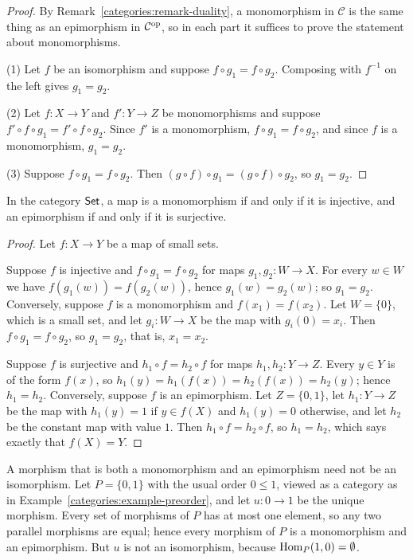 \begin{proof}
By Remark~\ref{categories:remark-duality}, a monomorphism in $\mathcal{C}$ is
the same thing as an epimorphism in $\mathcal{C}^{\mathrm{op}}$, so in each part it
suffices to prove the statement about monomorphisms.

(1) Let $f$ be an isomorphism and suppose $f \circ g_1 = f \circ g_2$.
Composing with $f^{-1}$ on the left gives $g_1 = g_2$.

(2) Let $f \colon X \to Y$ and $f' \colon Y \to Z$ be monomorphisms and suppose
$f' \circ f \circ g_1 = f' \circ f \circ g_2$. Since $f'$ is a monomorphism,
$f \circ g_1 = f \circ g_2$, and since $f$ is a monomorphism, $g_1 = g_2$.

(3) Suppose $f \circ g_1 = f \circ g_2$. Then
$(g \circ f) \circ g_1 = (g \circ f) \circ g_2$, so $g_1 = g_2$.
\end{proof}

\begin{lemma}\label{categories:lemma-mono-epi-sets}
In the category $\mathsf{Set}$, a map is a monomorphism if and only if it is
injective, and an epimorphism if and only if it is surjective.
\end{lemma}

\begin{proof}
Let $f \colon X \to Y$ be a map of small sets.

Suppose $f$ is injective and $f \circ g_1 = f \circ g_2$ for maps
$g_1, g_2 \colon W \to X$. For every $w \in W$ we have
$f(g_1(w)) = f(g_2(w))$, hence $g_1(w) = g_2(w)$; so $g_1 = g_2$. Conversely,
suppose $f$ is a monomorphism and $f(x_1) = f(x_2)$. Let $W = \{0\}$, which is
a small set, and let $g_i \colon W \to X$ be the map with $g_i(0) = x_i$. Then
$f \circ g_1 = f \circ g_2$, so $g_1 = g_2$, that is, $x_1 = x_2$.

Suppose $f$ is surjective and $h_1 \circ f = h_2 \circ f$ for maps
$h_1, h_2 \colon Y \to Z$. Every $y \in Y$ is of the form $f(x)$, so
$h_1(y) = h_1(f(x)) = h_2(f(x)) = h_2(y)$; hence $h_1 = h_2$. Conversely,
suppose $f$ is an epimorphism. Let $Z = \{0, 1\}$, let $h_1 \colon Y \to Z$ be
the map with $h_1(y) = 1$ if $y \in f(X)$ and $h_1(y) = 0$ otherwise, and let
$h_2$ be the constant map with value $1$. Then $h_1 \circ f = h_2 \circ f$,
so $h_1 = h_2$, which says exactly that $f(X) = Y$.
\end{proof}

\begin{counterexample}\label{categories:counterexample-mono-epi-preorder}
A morphism that is both a monomorphism and an epimorphism need not be an
isomorphism. Let $P = \{0, 1\}$ with the usual order $0 \leq 1$, viewed as a
category as in Example~\ref{categories:example-preorder}, and let
$u \colon 0 \to 1$ be the unique morphism. Every set of morphisms of $P$ has at
most one element, so any two parallel morphisms are equal; hence every
morphism of $P$ is a monomorphism and an epimorphism. But $u$ is not an
isomorphism, because $\operatorname{Hom}_P(1, 0) = \emptyset$.
\end{counterexample}

